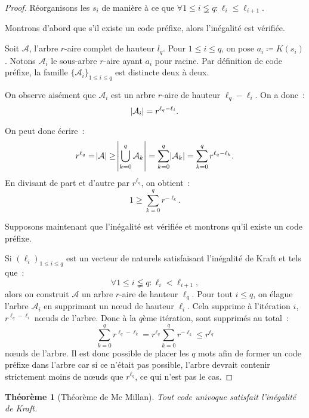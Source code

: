 \documentclass{article}
\newtheorem{thm}{Théorème}[section]
\theoremstyle{definition}
\theoremstyle{remark}
\begin{document}
		\begin{proof} Réorganisons les $s_i$ de manière à ce que $\forall 1 \leq i \lneqq q : \ell_i \leq \ell_{i+1}$.

		Montrons d'abord que s'il existe un code préfixe, alors l'inégalité est vérifiée.

		Soit $\mathcal A$, l'arbre $r$-aire complet de hauteur $l_q$. Pour $1 \leq i \leq q$, on pose $a_i \coloneqq K(s_i)$. Notons $\mathcal A_i$ le
		sous-arbre $r$-aire ayant $a_i$ pour racine. Par définition de code préfixe, la famille $\{\mathcal A_i\}_{1 \leq i \leq q}$ est distincte deux à deux.

		On observe aisément que $\mathcal A_i$ est un arbre $r$-aire de hauteur $\ell_q - \ell_i$. On a donc~:
		\[\abs {\mathcal A_i} = r^{\ell_q-\ell_i}.\]

		On peut donc écrire~:
		\[r^{\ell_q} = \abs {\mathcal A} \geq \abs {\bigcup_{k=0}^q\mathcal A_k} = \sum_{k=0}^q \abs {\mathcal A_k} = \sum_{k=0}^qr^{\ell_q-\ell_k}.\]
		En divisant de part et d'autre par $r^{\ell_q}$, on obtient~:
		\[1 \geq \sum_{k=0}^qr^{-\ell_k}.\]

		Supposons maintenant que l'inégalité est vérifiée et montrons qu'il existe un code préfixe.

		Si $(\ell_i)_{1 \leq i \leq q}$ est un vecteur de naturels satisfaisant l'inégalité de Kraft et tels que~:
		\[\forall 1 \leq i \lneqq q : \ell_i < \ell_{i+1},\]
		alors on construit $\mathcal A$ un arbre $r$-aire de hauteur $\ell_q$. Pour tout $i \leq q$, on élague l'arbre $\mathcal A_i$ en supprimant un nœud
		de hauteur $\ell_i$. Cela supprime à l'itération $i$, $r^{\ell_q-\ell_i}$ nœuds de l'arbre. Donc à la $q$ème itération, sont supprimés au total~:
		\[\sum_{k=0}^qr^{\ell_q-\ell_k} = r^{\ell_q}\sum_{k=0}^qr^{-\ell_k} \leq r^{\ell_q}\]
		nœuds de l'arbre. Il est donc possible de placer les $q$ mots afin de former un code préfixe dans l'arbre car si ce n'était pas possible, l'arbre
		devrait contenir strictement moins de nœuds que $r^{\ell_q}$, ce qui n'est pas le cas.
		\end{proof}

		\begin{thm}[Théorème de Mc Millan] Tout code univoque satisfait l'inégalité de Kraft. \end{thm}
\end{document}
